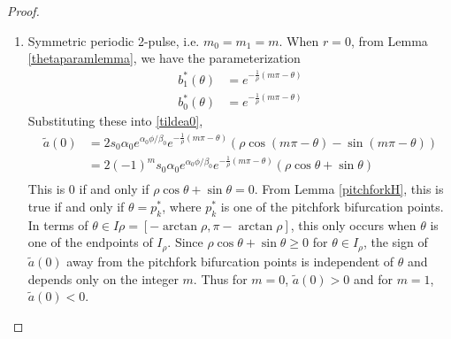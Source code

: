 \documentclass[thesis.tex]{subfiles}
\begin{document}
\begin{lemma}
\begin{proof}
\begin{enumerate}
\item Symmetric periodic 2-pulse, i.e. $m_0 = m_1 = m$. When $r = 0$, from Lemma \ref{thetaparamlemma}, we have the parameterization
\begin{equation*}
\begin{aligned}
b_1^*(\theta) &= e^{-\frac{1}{\rho}(m \pi - \theta) } \\
b_0^*(\theta) &= e^{-\frac{1}{\rho}(m \pi - \theta) }
\end{aligned}
\end{equation*}
Substituting these into \cref{tildea0}, 
\begin{align*}
\tilde{a}(0) &= 2 s_0 \alpha_0 e^{\alpha_0 \phi/\beta_0} e^{-\frac{1}{\rho}(m \pi - \theta) } \left( \rho \cos(m \pi - \theta) - \sin (m \pi - \theta) \right) \\
&= 2 (-1)^m s_0 \alpha_0 e^{\alpha_0 \phi/\beta_0} e^{-\frac{1}{\rho}(m \pi - \theta) } \left( \rho \cos\theta + \sin\theta \right) \\
\end{align*}
This is 0 if and only if $\rho \cos\theta + \sin\theta = 0$. From Lemma \ref{pitchforkH}, this is true if and only if $\theta = p^*_k$, where $p^*_k$ is one of the pitchfork bifurcation points. In terms of $\theta \in I\rho = [-\arctan \rho, \pi - \arctan \rho]$, this only occurs when $\theta$ is one of the endpoints of $I_\rho$. Since $\rho \cos\theta + \sin\theta \geq 0$ for $\theta \in I_\rho$, the sign of $\tilde{a}(0)$ away from the pitchfork bifurcation points is independent of $\theta$ and depends only on the integer $m$. Thus for $m = 0$, $\tilde{a}(0) > 0$ and for $m = 1$, $\tilde{a}(0) < 0$.


\end{enumerate}
\end{proof}
\end{lemma}
\end{document}
